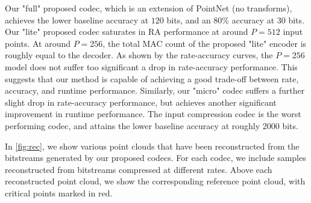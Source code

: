 
Our "full" proposed codec, which is an extension of PointNet (no transforms), achieves the lower baseline accuracy at $120$ bits, and an 80\% accuracy at $30$ bits.
Our "lite" proposed codec saturates in RA performance at around $P=512$ input points.
At around $P=256$, the total MAC count of the proposed "lite" encoder is roughly equal to the decoder.
As shown by the rate-accuracy curves, the $P=256$ model does not suffer too significant a drop in rate-accuracy performance.
This suggests that our method is capable of achieving a good trade-off between rate, accuracy, and runtime performance.
Similarly, our "micro" codec suffers a further slight drop in rate-accuracy performance, but achieves another significant improvement in runtime performance.
The input compression codec is the worst performing codec, and attains the lower baseline accuracy at roughly 2000 bits.

In \cref{fig:rec}, we show various point clouds that have been reconstructed from the bitstreams generated by our proposed codecs.
For each codec, we include samples reconstructed from bitstreams compressed at different rates.
Above each reconstructed point cloud, we show the corresponding reference point cloud, with critical points marked in red.


\showfigpccrateaccuracy{}
\showtablepccmeasurements{}


